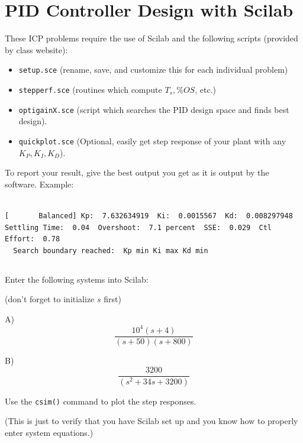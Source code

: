 \documentclass{article}	%
\begin{document}
\section{PID Controller Design with Scilab}

These ICP problems require the use of Scilab and the following scripts (provided by class website):
\begin{itemize}
\item {\tt setup.sce}  (rename, save, and customize this for each individual problem)
\item {\tt stepperf.sce} (routines which compute $T_s, \%OS$, etc.)
\item {\tt optigainX.sce} (script which searches the PID design space and finds best design).
\item {\tt quickplot.sce} (Optional, easily get step response of your plant with any $K_P,K_I,K_D$). 
\end{itemize}

To report your result, give the best output you get as it is output by the software.  Example:
\begin{verbatim}

[       Balanced] Kp:  7.632634919  Ki:  0.0015567  Kd:  0.008297948
Settling Time:  0.04  Overshoot:  7.1 percent  SSE:  0.029  Ctl Effort:  0.78
  Search boundary reached:  Kp min Ki max Kd min

\end{verbatim}
 
\subsection{}
 Enter the following systems into Scilab:

(don't forget to initialize $s$ first)

A) \[
\frac{10^4(s+4)}{(s+50)(s+800)}
\]

B) \[
\frac{3200}{(s^2+34s+3200)}
\]

Use the {\tt csim()} command to plot the step responses.

(This is just to verify that you have Scilab set up and you know how to properly enter system equations.)

%
%
\end{document}
